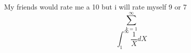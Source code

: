 \documentclass[12pt]{report}
\begin{document}
	My friends would rate me a 10 but i will rate myself 9 or 7
	\[
	\sum_{k=1}^{\infty}
	\]
	\begin{equation}
		\int_{1}^{\infty} \frac{1}{X} dX
	\end{equation}
\end{document}
